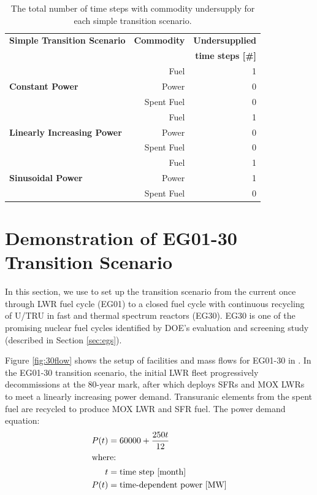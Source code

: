     \begin{table}[]
        \centering
        \doublespacing
        \caption {The total number of time steps with commodity undersupply 
        for each simple transition scenario. }
        \label{tab:transition-scenario-results}
            \small
            \begin{tabular}{l|rr}	
                \hline
                \textbf{Simple Transition Scenario}    & \textbf{Commodity}    & \textbf{Undersupplied} \\ 
                && \textbf{time steps [\#] } \\ \hline
                \multirow{3}{*}{\textbf{Constant Power}} & Fuel & 1 \\ 
                                                         & Power & 0 \\ 
                                                         & Spent Fuel & 0 \\ \hline
                \multirow{3}{*}{\textbf{Linearly Increasing Power}} & Fuel & 1 \\ 
                                                         & Power & 0 \\ 
                                                         & Spent Fuel & 0 \\ \hline
                \multirow{3}{*}{\textbf{Sinusoidal Power}} & Fuel & 1 \\ 
                                                         & Power & 1 \\ 
                                                         & Spent Fuel & 0 \\ \hline
                \end{tabular}
    \end{table}

\section{\deploy Demonstration of EG01-30 Transition Scenario} 
\label{sec:eg01-30}
In this section, we use \deploy to set up the transition scenario from 
the current once through LWR fuel cycle (EG01) to a closed fuel cycle 
with continuous recycling of U/TRU in fast and thermal spectrum 
reactors (EG30). 
EG30 is one of the promising nuclear fuel cycles identified by DOE's 
evaluation and screening study (described in Section \ref{sec:egs}).

Figure \ref{fig:30flow} shows the setup of facilities and mass flows 
for EG01-30 in \Cyclus. 
In the EG01-30 transition scenario, the initial LWR fleet 
progressively decommissions at the 80-year mark,
after which \deploy deploys \glspl{SFR} and \gls{MOX} \glspl{LWR} to 
meet a linearly increasing power demand. 
Transuranic elements from the spent fuel are recycled to 
produce \gls{MOX} \gls{LWR} and \gls{SFR} fuel. 
The power demand equation: 
\begin{align}
    P(t) &= 60000 + \frac{250t}{12} \\ 
    \intertext{where:}
    t &= \mbox{time step [month]} \nonumber \\
    P(t) &= \mbox{time-dependent power [MW]} \nonumber
\end{align}

